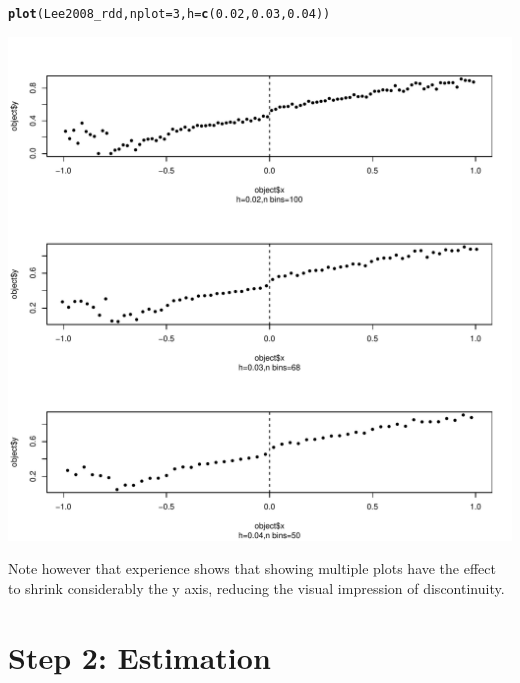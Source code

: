 \documentclass[english,nojss]{jss}\usepackage{graphicx, color}
\makeatletter
\def\maxwidth{ %
  \ifdim\Gin@nat@width>\linewidth
    \linewidth
  \else
    \Gin@nat@width
  \fi
}
\newcommand{\hlfunctioncall}[1]{\textcolor[rgb]{0.501960784313725,0,0.329411764705882}{\textbf{#1}}}%
\newenvironment{kframe}{%
 \def\at@end@of@kframe{}%
 \ifinner\ifhmode%
  \def\at@end@of@kframe{\end{minipage}}%
  \begin{minipage}{\columnwidth}%
 \fi\fi%
 \def\FrameCommand##1{\hskip\@totalleftmargin \hskip-\fboxsep
 \colorbox{shadecolor}{##1}\hskip-\fboxsep
     \hskip-\linewidth \hskip-\@totalleftmargin \hskip\columnwidth}%
 \MakeFramed {\advance\hsize-\width
   \@totalleftmargin\z@ \linewidth\hsize
   \@setminipage}}%
 {\par\unskip\endMakeFramed%
 \at@end@of@kframe}
\newenvironment{knitrout}{}{} %
\makeatother
\begin{document}
\begin{knitrout}
\color{fgcolor}\begin{kframe}
\begin{alltt}
\hlfunctioncall{plot}(Lee2008_rdd, nplot = 3, h = \hlfunctioncall{c}(0.02, 0.03, 0.04))
\end{alltt}
\end{kframe}
\includegraphics[width=\maxwidth]{figure/unnamed-chunk-5} 

\end{knitrout}


Note however that experience shows that showing multiple plots have
the effect to shrink considerably the y axis, reducing the visual
impression of discontinuity. 


\section{Step 2: Estimation}

\end{document}
